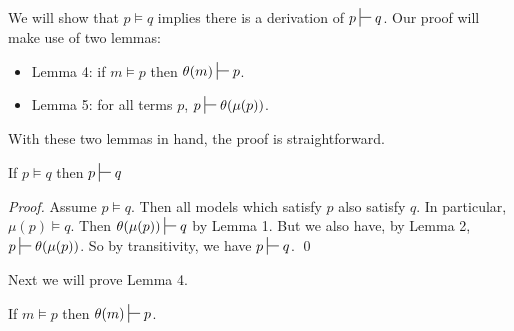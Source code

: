 \documentclass[smallextended]{svjour3}       %
\numberwithin{subcase}{mycase}
\def\judge {\sststile{\mathrm{}}{}}
\begin{document}
We will show that $p \models q$ implies there is a derivation of $p \judge q$.
Our proof will make use of two lemmas:
\begin{itemize}
\item
Lemma 4: if $m \models p$ then $\theta(m) \judge p$.
\item
Lemma 5: for all terms $p$, $p \judge \theta(\mu(p))$.
\end{itemize}
With these two lemmas in hand, the proof is straightforward.
\begin{theorem}
If $p \models q$ then $p \judge q$
\end{theorem}
\begin{proof}
Assume $p \models q$. 
Then all models which satisfy $p$ also satisfy $q$.
In particular, $\mu(p) \models q$.
Then $\theta(\mu(p)) \judge q$ by Lemma 1.
But we also have, by Lemma 2, $p \judge \theta(\mu(p)) $.
So by transitivity, we have $p \judge q$.
\qed
\end{proof}
Next we will prove Lemma 4.
\begin{lemma}
If $m \models p$ then $\theta(m) \judge p$.
\end{lemma}
\end{document}
